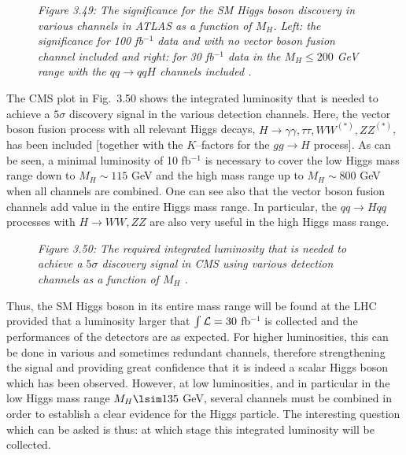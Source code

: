 \begin{figure}[!h]
\vspace*{-1.cm}
\begin{center}
\hspace*{2mm}
\end{center}
\vspace*{-.2cm}
{\it Figure 3.49: The significance for the SM Higgs boson discovery in various 
channels in ATLAS as a function of $M_H$. Left:  the significance for 100 
fb$^{-1}$ data and with no vector boson fusion channel included and right: 
for 30 fb$^{-1}$ data in the $M_H \leq 200$ GeV range with the $qq \to qqH$ 
channels included \cite{ATLAS-review}.}
\vspace*{-.4cm}
\end{figure}

The CMS plot in Fig.~3.50 shows the integrated luminosity that is needed to
achieve a $5\sigma$ discovery signal in the various detection channels. Here,
the vector boson fusion process with all relevant Higgs decays, $H \to \gamma
\gamma, \tau \tau, WW^{(*)},ZZ^{(*)}$, has been included [together with the
$K$--factors for the $gg\to H$ process]. As can be seen, a minimal luminosity
of 10 fb$^{-1}$ is necessary to cover the low Higgs mass range down to $M_H
\sim 115$ GeV and the high mass range up to $M_H \sim 800$ GeV when all
channels are combined. One can see also
that the vector boson fusion channels add value in the entire Higgs mass range.
In particular, the $qq \to Hqq$ processes with $H \to  WW,ZZ$ are also very 
useful in the high Higgs mass range. \s

\begin{figure}[!h]
\vspace*{-.5cm}
\begin{center}
\end{center}
\vspace*{-.2cm}
{\it Figure 3.50: The required integrated luminosity that is needed to achieve 
a $5\sigma$ discovery signal in CMS using various detection channels as a
function of $M_H$ \cite{CMS-review}.}
\vspace*{-.2cm}
\end{figure}

Thus, the SM Higgs boson in its entire mass range will be found at the LHC
provided that a luminosity larger that $\int {\cal L}= 30$ fb$^{-1}$ is
collected and the performances of the detectors are as expected. For higher
luminosities, this can be done in various and sometimes redundant channels,
therefore strengthening the signal and providing great confidence that it is
indeed a scalar Higgs boson which has been observed. However, at low
luminosities, and in particular in the low Higgs mass range $M_H \lsim 135$
GeV, several channels must be combined in order to establish a clear evidence
for the Higgs particle. The interesting question which can be asked is thus: at
which stage this integrated luminosity will be collected.\s


